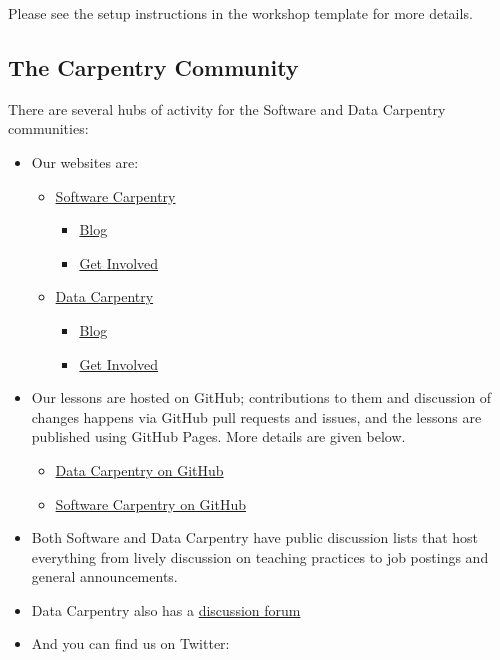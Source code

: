 Please see the setup instructions in the workshop template for more
details.

\subsection{The Carpentry Community}\label{the-carpentry-community}

There are several hubs of activity for the Software and Data Carpentry
communities:

\begin{itemize}
\itemsep1pt\parskip0pt
\item
  Our websites are:

  \begin{itemize}
  \itemsep1pt\parskip0pt
  \item
    \href{\{\{\%20site.swc\_site\%20\}\}}{Software Carpentry}

    \begin{itemize}
    \itemsep1pt\parskip0pt
    \item
      \href{\{\{\%20site.swc\_site\%20\}\}/blog/}{Blog}
    \item
      \href{\{\{\%20site.swc\_site\%20\}\}/join/}{Get Involved}
    \end{itemize}
  \item
    \href{\{\{\%20site.dc\_site\%20\}\}}{Data Carpentry}

    \begin{itemize}
    \itemsep1pt\parskip0pt
    \item
      \href{\{\{\%20site.dc\_site\%20\}\}/blog/}{Blog}
    \item
      \href{\{\{\%20site.dc\_site\%20\}\}/involved/}{Get Involved}
    \end{itemize}
  \end{itemize}
\item
  Our lessons are hosted on GitHub; contributions to them and discussion
  of changes happens via GitHub pull requests and issues, and the
  lessons are published using GitHub Pages. More details are given
  below.

  \begin{itemize}
  \itemsep1pt\parskip0pt
  \item
    \href{\{\{\%20site.dc\_github\%20\}\}}{Data Carpentry on GitHub}
  \item
    \href{\{\{\%20site.swc\_github\%20\}\}}{Software Carpentry on GitHub}
  \end{itemize}
\item
  Both Software and Data Carpentry have public discussion lists that
  host everything from lively discussion on teaching practices to job
  postings and general announcements.
\item
  Data Carpentry also has a
  \href{http://discuss.datacarpentry.org/}{discussion forum}
\item
  And you can find us on Twitter:


\end{itemize}
